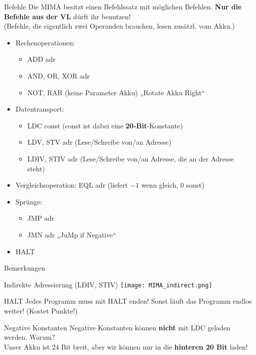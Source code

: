 \newcommand{\itemizeconfig}{\setlength{\parsep}{0pt}\setlength{\parskip}{0pt}\setlength{\topsep}{0pt}\setlength{\partopsep}{0pt}}
\begin{frame}{Befehle}
	Die MIMA besitzt einen Befehlssatz mit möglichen Befehlen. %
	\textbf{Nur die Befehle aus der VL} dürft ihr benutzen! \\ 
	\smallskip
	(Befehle, die eigentlich zwei Operanden brauchen, lesen zusätzl. vom Akku.)
	{
	\begin{itemize}[<+->] \itemizeconfig
		\item Rechenoperationen:
		\begin{itemize} 
			\item ADD adr 
			\item AND, OR, XOR adr
			\item NOT, RAR \quad (keine Parameter \impl Akku) \quad „Rotate Akku Right“
		\end{itemize}
		\item Datentransport:
		\begin{itemize}
			\item LDC const \quad (const ist dabei eine \textbf{20-Bit}-Konstante)
			\item LDV, STV adr \quad (Lese/Schreibe von/an Adresse)
			\item LDIV, STIV adr \quad (Lese/Schreibe von/an Adresse, die an der Adresse steht)
		\end{itemize}
		\item Vergleichsoperation: EQL adr \quad (liefert $-1$ wenn gleich, 0 sonst)
		\item Sprünge:
		\begin{itemize}
			\item JMP adr
			\item JMN adr \quad „JuMp if Negative“
		\end{itemize}
		\item HALT
	\end{itemize}}
\end{frame}

\begin{frame}{Bemerkungen}
	\begin{block}{Indirekte Adressierung (LDIV, STIV)}
		\centering
		\texttt{[image: MIMA\_indirect.png]}
	\end{block}
	
	\pause
	\begin{block}{HALT}
		Jedes Programm muss mit HALT enden! Sonst läuft das Programm endlos weiter! (Kostet Punkte!)
	\end{block}

	\pause
	\begin{block}{Negative Konstanten}
		Negative Konstanten können \textbf{nicht} mit LDC geladen werden. Warum? \\
		\pause \impl Unser Akku ist 24 Bit breit, aber wir können nur in die \textbf{hinteren 20 Bit} laden!
	\end{block}
\end{frame}

